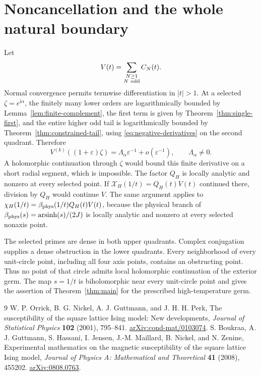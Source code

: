 \documentclass[11pt]{article}
\numberwithin{equation}{section}
\theoremstyle{remark}\newtheorem{remark}[theorem]{Remark}
\newcommand{\ii}{\mathrm i}
\newcommand{\X}{\mathcal X_H}
\begin{document}
\section{Noncancellation and the whole natural boundary}
Let
\[
 V(t)=\sum_{\substack{N\ge1\\N\ {\rm odd}}}C_N(t).
\]
Normal convergence permits termwise differentiation in $|t|>1$.
At a selected $\zeta=e^{\ii\alpha}$, the finitely many lower
orders are logarithmically bounded by Lemma~\ref{lem:finite-complement},
the first term is given by Theorem~\ref{thm:single-first},
and the entire higher odd tail is logarithmically bounded by
Theorem~\ref{thm:constrained-tail}, using
\eqref{eq:negative-derivatives} on the second quadrant.
Therefore
\[
 V^{(k)}((1+\varepsilon)\zeta)
       =\Lambda_\alpha\varepsilon^{-1}+o(\varepsilon^{-1}),
 \qquad \Lambda_\alpha\ne0.
\]
A holomorphic continuation through $\zeta$ would bound this
finite derivative on a short radial segment, which is impossible.
The factor $Q_H$ is locally analytic and nonzero at every selected
point. If $\X(1/t)=Q_H(t)V(t)$ continued there, division by
$Q_H$ would continue $V$. The same argument applies to
$\chi_H(1/t)=\beta_{\rm phys}(1/t)Q_H(t)V(t)$, because the
physical branch of $\beta_{\rm phys}(s)=\operatorname{arsinh}(s)/(2J)$
is locally analytic and nonzero at every selected nonaxis point.

The selected primes are dense in both upper quadrants.
Complex conjugation supplies a dense obstruction in the lower
quadrants. Every neighborhood of every unit-circle point,
including all four axis points, contains an obstructing point.
Thus no point of that circle admits local holomorphic continuation
of the exterior germ. The map $s=1/t$ is biholomorphic near every
unit-circle point and gives the assertion of
Theorem~\ref{thm:main} for the prescribed high-temperature germ.

\begin{thebibliography}{9}
W. P. Orrick, B. G. Nickel, A. J. Guttmann, and J. H. H. Perk,
The susceptibility of the square lattice Ising model: New developments,
\emph{Journal of Statistical Physics} \textbf{102} (2001), 795--841.
\href{https://arxiv.org/abs/cond-mat/0103074}{arXiv:cond-mat/0103074}.
S. Boukraa, A. J. Guttmann, S. Hassani, I. Jensen, J.-M. Maillard,
B. Nickel, and N. Zenine, Experimental mathematics on the magnetic
susceptibility of the square lattice Ising model,
\emph{Journal of Physics A: Mathematical and Theoretical}
\textbf{41} (2008), 455202.
\href{https://arxiv.org/abs/0808.0763}{arXiv:0808.0763}.
\end{thebibliography}
\end{document}
